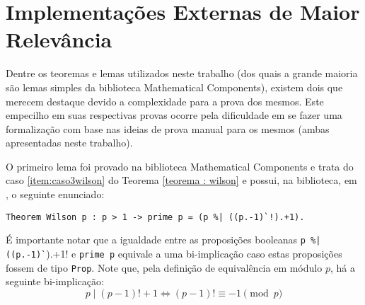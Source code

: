 
\section{Implementações Externas de Maior Relevância}
\label{sec:implementacoes}

Dentre os teoremas e lemas utilizados neste trabalho (dos quais a grande maioria são lemas simples da biblioteca Mathematical Components), existem dois que merecem destaque devido a complexidade para a prova dos mesmos. Este empecilho em suas respectivas provas ocorre pela dificuldade em se fazer uma formalização com base nas ideias de prova manual para os mesmos (ambas apresentadas neste trabalho).

O primeiro lema foi provado na biblioteca Mathematical Components e trata do caso \ref{item:caso3wilson} do Teorema \ref{teorema : wilson} e possui, na biblioteca, em \cite{mathcomp-binomial}, o seguinte enunciado:
        \begin{lstlisting}[language=coq,frame=single,tabsize=1]
Theorem Wilson p : p > 1 -> prime p = (p %| ((p.-1)`!).+1).
        \end{lstlisting}
É importante notar que a igualdade entre as proposições booleanas \lstinline[language=coq]!p %| ((p.-1)`!).+1! e \lstinline[language=coq]!prime p! equivale a uma bi-implicação caso estas proposições fossem de tipo \lstinline[language=coq]|Prop|. Note que, pela definição de equivalência em módulo $p$, há a seguinte bi-implicação:
        \begin{equation}
                p \mid (p-1)! + 1 \Longleftrightarrow (p-1)! \equiv -1 \pmod{p} 
        \end{equation}

